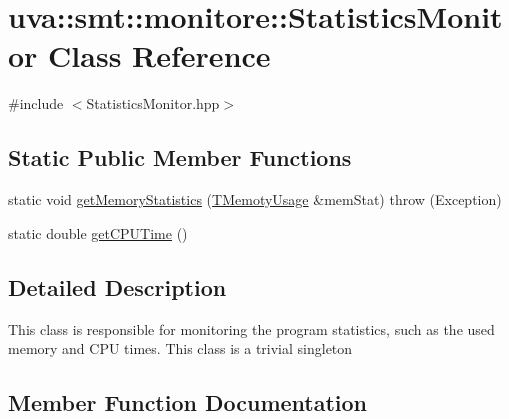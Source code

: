 \hypertarget{classuva_1_1smt_1_1monitore_1_1_statistics_monitor}{}\section{uva\+:\+:smt\+:\+:monitore\+:\+:Statistics\+Monitor Class Reference}
\label{classuva_1_1smt_1_1monitore_1_1_statistics_monitor}


{\ttfamily \#include $<$Statistics\+Monitor.\+hpp$>$}

\subsection*{Static Public Member Functions}
\begin{DoxyCompactItemize}
\item 
static void \hyperlink{classuva_1_1smt_1_1monitore_1_1_statistics_monitor_ad035148c19b9b5dff93a6450fb7635ba}{get\+Memory\+Statistics} (\hyperlink{structuva_1_1smt_1_1monitore_1_1_t_memoty_usage}{T\+Memoty\+Usage} \&mem\+Stat)  throw (\+Exception)
\item 
static double \hyperlink{classuva_1_1smt_1_1monitore_1_1_statistics_monitor_aa3d29b120f9cc6f8bfbbef053a029dd3}{get\+C\+P\+U\+Time} ()
\end{DoxyCompactItemize}


\subsection{Detailed Description}
This class is responsible for monitoring the program statistics, such as the used memory and C\+P\+U times. This class is a trivial singleton 

\subsection{Member Function Documentation}
\hypertarget{classuva_1_1smt_1_1monitore_1_1_statistics_monitor_aa3d29b120f9cc6f8bfbbef053a029dd3}{}
